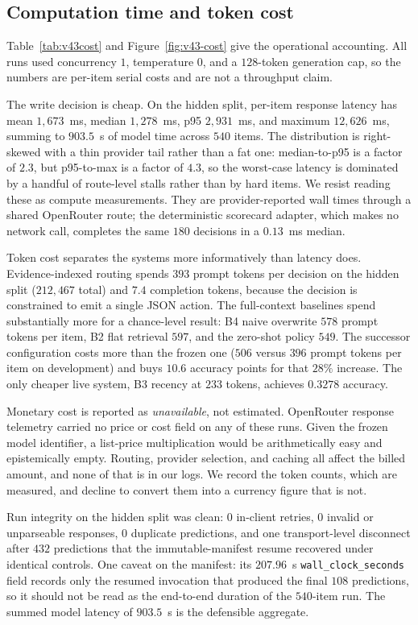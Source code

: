 \subsection{Computation time and token cost}
\label{sec:results:cost}

Table~\ref{tab:v43cost} and Figure~\ref{fig:v43-cost} give the operational
accounting. All runs used concurrency $1$, temperature $0$, and a $128$-token
generation cap, so the numbers are per-item serial costs and are not a
throughput claim.

The write decision is cheap. On the hidden split, per-item response latency has
mean $1{,}673$~ms, median $1{,}278$~ms, p95 $2{,}931$~ms, and maximum
$12{,}626$~ms, summing to $903.5$~s of model time across $540$ items. The
distribution is right-skewed with a thin provider tail rather than a fat one:
median-to-p95 is a factor of $2.3$, but p95-to-max is a factor of $4.3$, so the
worst-case latency is dominated by a handful of route-level stalls rather than
by hard items. We resist reading these as compute measurements. They are
provider-reported wall times through a shared OpenRouter route; the
deterministic scorecard adapter, which makes no network call, completes the same
$180$ decisions in a $0.13$~ms median.

Token cost separates the systems more informatively than latency does.
Evidence-indexed routing spends $393$ prompt tokens per decision on the hidden
split ($212{,}467$ total) and $7.4$ completion tokens, because the decision is
constrained to emit a single JSON action. The full-context baselines spend
substantially more for a chance-level result: B4 naive overwrite $578$ prompt
tokens per item, B2 flat retrieval $597$, and the zero-shot policy $549$. The
successor configuration costs more than the frozen one ($506$ versus $396$
prompt tokens per item on development) and buys $10.6$ accuracy points for that $28\%$
increase. The only cheaper live system, B3 recency at $233$ tokens, achieves
$0.3278$ accuracy.

Monetary cost is reported as \emph{unavailable}, not estimated. OpenRouter
response telemetry carried no price or cost field on any of these runs. Given
the frozen model identifier, a list-price multiplication would be arithmetically
easy and epistemically empty. Routing, provider selection, and caching all
affect the billed amount, and none of that is in our logs. We record the token
counts, which are measured, and decline to convert them into a currency figure
that is not.

Run integrity on the hidden split was clean: $0$ in-client retries, $0$ invalid
or unparseable responses, $0$ duplicate predictions, and one transport-level
disconnect after $432$ predictions that the immutable-manifest resume recovered
under identical controls. One caveat on the manifest: its
$207.96$~s \texttt{wall\_clock\_seconds} field records only the resumed
invocation that produced the final $108$ predictions, so it should not be read
as the end-to-end duration of the $540$-item run. The summed model latency of
$903.5$~s is the defensible aggregate.

